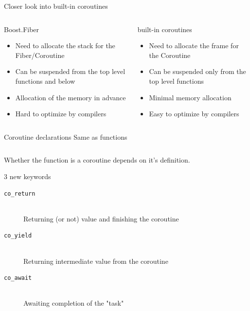 \documentclass[10pt]{beamer}
\newcommand{\code}[1]{\texttt{#1}}
\begin{document}
\begin{frame}{Closer look into built-in coroutines}

  \begin{columns}[t]
  \begin{column}{0.48\linewidth}
  \centerline{Boost.Fiber}
  \vfill
  \begin{itemize}
  \item Need to allocate the stack for the Fiber/Coroutine
  \item Can be suspended from the top level functions and below
  \item Allocation of the memory in advance
  \item Hard to optimize by compilers
  \end{itemize}
  \end{column}
  \begin{column}{0.48\linewidth}
  \centerline{\alert{built-in coroutines}}
  \vfill
  \begin{itemize}[<+- |alert@+>]
  \item Need to allocate the frame for the Coroutine
  \item Can be suspended only from the top level functions
  \item Minimal memory allocation
  \item Easy to optimize by compilers
  \end{itemize}
  \end{column}
  
  \end{columns}
  
\end{frame}

\begin{frame}[fragile]{Coroutine declarations}
  \centering Same as functions

  \vfill
  \begin{center}
  \begin{minipage}{0.7\linewidth}
  \inputminted{c++}{code-examples/intro/declaration.hpp}
  \end{minipage}
  \end{center}
  \vfill

  Whether the function is a coroutine depends on \alert{it's definition}.

\end{frame}

\begin{frame}{3 new keywords}
  \begin{description}
    \item [\code{\alert{co\_return}}] \hfill \\ Returning (or not) value and finishing the coroutine
    \item [\code{\alert{co\_yield}}] \hfill \\ Returning intermediate value from the coroutine
    \item [\code{\alert{co\_await}}] \hfill \\ Awaiting completion of the "task"
  \end{description}
\end{frame}
\end{document}

